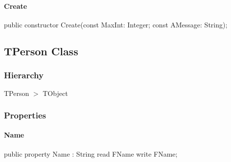 \documentclass{report}
\begin{document}
\paragraph*{Create}\hspace*{\fill}

\begin{list}{}{
\setlength{\itemindent}{0cm}
\setlength{\listparindent}{0cm}
\setlength{\leftmargin}{\evensidemargin}
\addtolength{\leftmargin}{\tmplength}
\settowidth{\labelsep}{X}
\addtolength{\leftmargin}{\labelsep}
\setlength{\labelwidth}{\tmplength}
}
\begin{flushleft}
\item[\textbf{Declaration}\hfill]
\begin{ttfamily}
public constructor Create(const MaxInt: Integer; const AMessage: String);\end{ttfamily}


\end{flushleft}
\end{list}
\subsection*{TPerson Class}
\subsubsection*{\large{\textbf{Hierarchy}}\normalsize\hspace{1ex}\hfill}
TPerson {$>$} TObject
\subsubsection*{\large{\textbf{Properties}}\normalsize\hspace{1ex}\hfill}
\paragraph*{Name}\hspace*{\fill}

\begin{list}{}{
\setlength{\itemindent}{0cm}
\setlength{\listparindent}{0cm}
\setlength{\leftmargin}{\evensidemargin}
\addtolength{\leftmargin}{\tmplength}
\settowidth{\labelsep}{X}
\addtolength{\leftmargin}{\labelsep}
\setlength{\labelwidth}{\tmplength}
}
\begin{flushleft}
\item[\textbf{Declaration}\hfill]
\begin{ttfamily}
public property Name : String read FName write FName;\end{ttfamily}


\end{flushleft}
\end{list}
\end{document}
